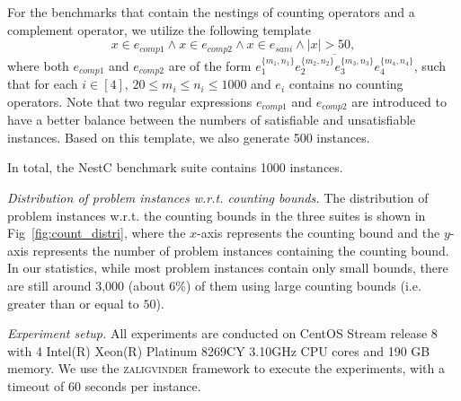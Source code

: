 For the benchmarks that contain the nestings of counting operators and a complement operator, we utilize the following template
\[x \in e_{comp1} \wedge x \in e_{comp2} \wedge x \in e_{sani} \wedge |x| > 50, \]
where both $e_{comp1}$ and $e_{comp2}$ are of the form $\overline{e_1^{\{m_1,n_1\}}e_2^{\{m_2,n_2\}}e_3^{\{m_3,n_3\}} e_4^{\{m_4, n_4\}}}$, such that for each $i \in [4]$, $20 \leq m_i\leq n_i\leq 1000$  and $e_i$ contains no counting operators. Note that two regular expressions $e_{comp1} $ and $e_{comp2}$ are introduced to have a better balance between the numbers of satisfiable and unsatisfiable instances. Based on this template, we also generate 500 instances. 

In total, the NestC benchmark suite contains 1000 instances. 


\medskip
\noindent
\emph{Distribution of problem instances w.r.t. counting bounds. }
The distribution of problem instances w.r.t. the counting bounds in the three suites is shown in Fig~\ref{fig:count_distri}, where the $x$-axis represents the counting bound and the $y$-axis represents the number of problem instances containing the counting bound. 
In our statistics, while most problem instances contain only small bounds, there are still around 3,000  (about 6\%) of them using large counting bounds (i.e. greater than or equal to $50$).

\medskip
\noindent
\emph{Experiment setup.}
All experiments are conducted on CentOS Stream release 8 with 4 Intel(R) Xeon(R) Platinum 8269CY 3.10GHz CPU cores and 190 GB memory. We use the \textsc{zaligvinder} framework \cite{zaligvinder_2021} to execute the experiments, with a timeout of 60 seconds per instance.


